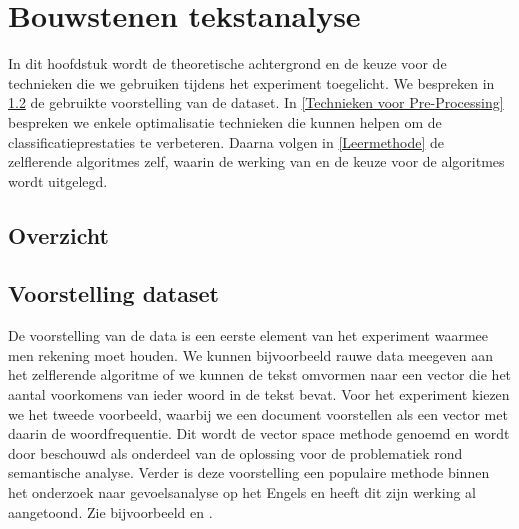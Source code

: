 \chapter{Bouwstenen tekstanalyse}\label{Lectuur}

In dit hoofdstuk wordt de theoretische achtergrond en de keuze voor de technieken die we gebruiken tijdens het experiment toegelicht. We bespreken in \ref{Voorstelling dataset} de gebruikte voorstelling van de dataset. In \ref{Technieken voor Pre-Processing} bespreken we enkele optimalisatie technieken die kunnen helpen om de classificatieprestaties te verbeteren. Daarna volgen in \ref{Leermethode} de zelflerende algoritmes zelf, waarin de werking van en de keuze voor de algoritmes wordt uitgelegd. 

\section{Overzicht}\label{Overzicht}

\section{Voorstelling dataset}\label{Voorstelling dataset}
%
De voorstelling van de data is een eerste element van het experiment waarmee men rekening moet houden. We kunnen bijvoorbeeld rauwe data meegeven aan het zelflerende algoritme of we kunnen de tekst omvormen naar een vector die het aantal voorkomens van ieder woord in de tekst bevat. Voor het experiment kiezen we het tweede voorbeeld, waarbij we een document voorstellen als een vector met daarin de woordfrequentie. Dit wordt de vector space methode genoemd en wordt door \cite{turney2010frequency} beschouwd als onderdeel van de oplossing voor de problematiek rond semantische analyse. Verder is deze voorstelling een populaire methode binnen het onderzoek naar gevoelsanalyse op het Engels en heeft dit zijn werking al aangetoond. Zie bijvoorbeeld \cite{pang2002thumbs} en \cite{maas2011learnin}.

